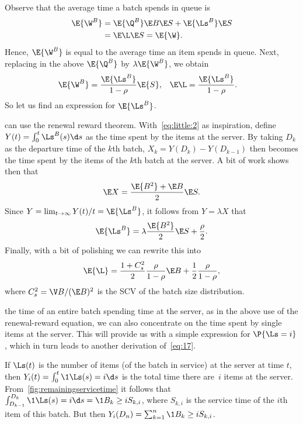 Observe that the average time a batch spends in queue is
\begin{align*}
  \E{\W^B} &= \E{\Q^B} \E B \E S + \E{\Ls^B}\E S \\
&=  \E\L \E S = \E{\W}.
\end{align*}
Hence, $\E{\W^B}$ is equal to  the average time an item spends in queue.
Next, replacing in the above  $\E{\Q^B}$ by $\lambda \E{\W^B}$, we obtain
\begin{align}\label{eq:96}
 \E{\W^B} &= \frac{\E{\Ls^B}}{1-\rho}\E{S}, &  \E\L  &= \frac{\E{\Ls^B}}{1-\rho}.
\end{align}
So let us find an expression for $\E{\Ls^B}$.

 can use the renewal reward theorem.
With~\cref{eq:little:2} as inspiration, define $Y(t) = \int_0^t \Ls^B(s) \d s$ as the time spent by the items at the server.
By taking $D_k$ as the departure time of the $k$th batch, $X_k = Y(D_k)-Y(D_{k-1})$ then becomes the time spent by the items of the $k$th batch at the server.
A bit of work shows then that
\begin{equation}\label{eq:9}
  \E X = \frac{\E{B^2}+\E B}2 \E S.
\end{equation}
Since $Y=\lim_{t\to\infty} Y(t)/t = \E{\Ls^{B}}$, it follows from $Y=\lambda X$ that
\begin{equation}\label{eq:17}
  \E{\Ls^B} = \lambda \frac{\E{B^2}}2\E S + \frac\rho 2.
\end{equation}
Finally, with a bit of polishing we can rewrite this into
\begin{equation}\label{eq:43}
\E{\L} = %
\frac{1+C_s^2}2 \frac{\rho}{1-\rho} \E B  + \frac12\frac\rho{1-\rho},
\end{equation}
where $C_s^2 = \V B/ (\E B)^{2}$ is the SCV of the batch size distribution.


 the time of an entire batch spending time at the server, as in the above use of the renewal-reward equation, we can also concentrate on the time spent by single items at the server.
This will provide us with a simple expression for $\P{\Ls=i}$, which in turn leads to another derivation of~\cref{eq:17}.

If $\Ls(t)$ is the number of items (of the batch in service) at the server at time $t$, then $Y_i(t) = \int_0^t \1{\Ls(s)=i} \d s$ is the total time there are~$i$ items at the server.
From~\cref{fig:remainingservicetime} it follows that
$\int_{ D_{k-1}}^{D_k} \1{\Ls(s)=i} \d s = \1{B_k \geq i} S_{k,i}$,
where $S_{k,i}$ is the service time of the $i$th item of this batch. But then
$Y_i(D_n) = \sum_{k=1}^n \1{B_k\geq i} S_{k,i}$.


